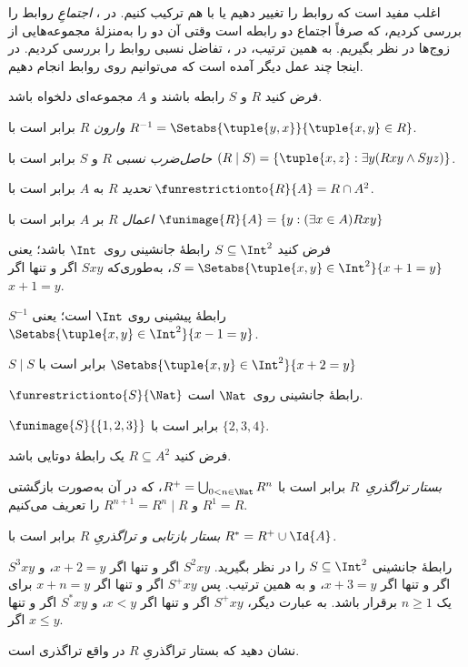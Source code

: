 \documentclass[../../../include/open-logic-section]{subfiles}
\begin{document}

اغلب مفید است که روابط را تغییر دهیم یا با هم ترکیب کنیم. در
، \emph{اجتماعِ}
روابط را بررسی کردیم، که صرفاً اجتماع دو رابطه است وقتی آن دو را
به‌منزلهٔ مجموعه‌هایی از زوج‌ها در نظر بگیریم. به همین ترتیب، در
، تفاضل نسبی روابط را
بررسی کردیم. در اینجا چند عمل دیگر آمده است که می‌توانیم روی روابط انجام دهیم.

\begin{defn}
فرض کنید $R$ و $S$ رابطه باشند و $A$ مجموعه‌ای دلخواه باشد.

\emph{وارون} $R$ برابر است با $R^{-1} = \Setabs{\tuple{y, x}}{\tuple{x,
    y} \in R}$.

\emph{حاصل‌ضرب نسبی} $R$ و $S$ برابر است با $(R \mid S) =
\{\tuple{x, z} : \exists y(Rxy \land Syz)\}$.

\emph{تحدید} $R$ به $A$ برابر است با $\funrestrictionto{R}{A}= R
\cap A^2$.

\emph{اعمال} $R$ بر $A$ برابر است با $\funimage{R}{A} = \{y :
(\exists x \in A)Rxy\}$
\end{defn}

\begin{ex}
فرض کنید $S \subseteq \Int^2$ رابطهٔ جانشینی روی~$\Int$ باشد؛ یعنی
$S = \Setabs{\tuple{x, y} \in \Int^2}{x + 1 = y}$، به‌طوری‌که $Sxy$ اگر و تنها اگر $x + 1 = y$.

$S^{-1}$ رابطهٔ پیشینی روی $\Int$ است؛ یعنی
$\Setabs{\tuple{x,y}\in\Int^2}{x -1 =y}$.

$S\mid S$ برابر است با
$ \Setabs{\tuple{x,y}\in\Int^2}{x + 2 =y}$

$\funrestrictionto{S}{\Nat}$ رابطهٔ جانشینی روی~$\Nat$ است.

$\funimage{S}{\{1,2,3\}}$ برابر است با $\{2, 3, 4\}$.
\end{ex}

\begin{defn}فرض کنید $R \subseteq A^2$ یک رابطهٔ دوتایی باشد.

\emph{بستار تراگذریِ}~$R$ برابر است با $R^+ = \bigcup_{0 < n \in
\Nat} R^n$، که در آن به‌صورت بازگشتی $R^1 = R$ و $R^{n+1} = R^n
\mid R$ را تعریف می‌کنیم.

\emph{بستار بازتابی و تراگذریِ} $R$ برابر است با $R^* = R^+ \cup
\Id{A}$.
\end{defn}

\begin{ex}
رابطهٔ جانشینی $S \subseteq \Int^2$ را در نظر بگیرید. $S^2xy$ اگر و تنها اگر $x + 2 =
y$، و $S^3xy$ اگر و تنها اگر $x + 3 = y$، و به همین ترتیب. پس $S^+xy$ اگر و تنها اگر $x + n = y$ برای یک
$n \geq 1$ برقرار باشد. به عبارت دیگر، $S^+xy$ اگر و تنها اگر $x < y$، و $S^*xy$ اگر و تنها اگر $x \le
y$.
\end{ex}

\begin{prob}
نشان دهید که بستار تراگذریِ $R$ در واقع تراگذری است.
\end{prob}
\end{document}
